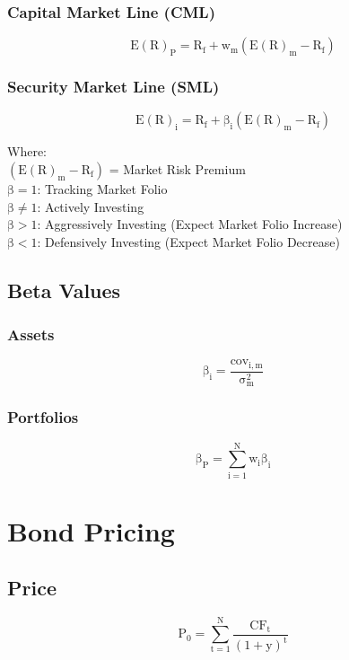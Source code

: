\documentclass[11pt, english]{article}
\begin{document}
		\subsubsection{Capital Market Line (CML)}

	$$\mathrm{E(R)_P=R_f+w_m\left(E(R)_m-R_f\right)}$$

		\subsubsection{Security Market Line (SML)}

	$$\mathrm{E(R)_i=R_f+\beta_i\left(E(R)_m-R_f\right)}$$

	Where:\\
	$\mathrm{\left(E(R)_m-R_f\right)}$ = Market Risk Premium\\
	$\mathrm{\beta=1}$: Tracking Market Folio\\
	$\mathrm{\beta\neq 1}$: Actively Investing\\
	$\mathrm{\beta>1}$: Aggressively Investing (Expect Market Folio Increase)\\
	$\mathrm{\beta<1}$: Defensively Investing (Expect Market Folio Decrease)

	\subsection{Beta Values}

		\subsubsection{Assets}

	$$\mathrm{\beta_i=\frac{cov_{i,m}}{\sigma_m^2}}$$

		\subsubsection{Portfolios}

	$$\mathrm{\beta_P=\sum_{i=1}^N w_i\beta_i}$$

\newpage

\section{Bond Pricing}

	\subsection{Price}

	$$\mathrm{P_0=\sum_{t=1}^N\frac{CF_t}{(1+y)^t}}$$
\end{document}
